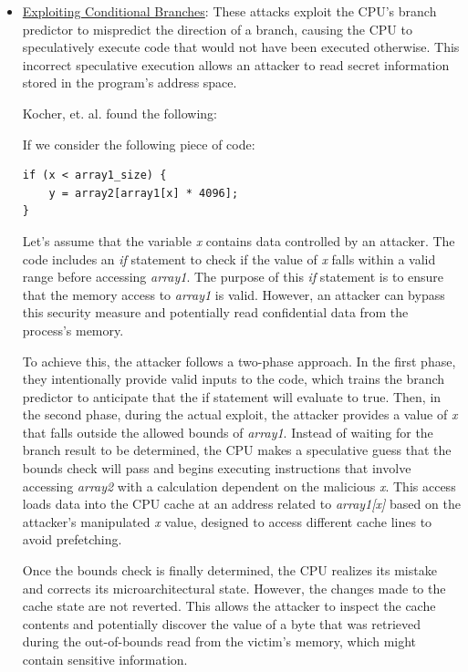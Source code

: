 \documentclass[twocolumn,showpacs,%
  nofootinbib,aps,superscriptaddress,%
  eqsecnum,prd,notitlepage,showkeys,10pt]{revtex4-1}
\begin{document}
\begin{itemize}
\item \underline{Exploiting Conditional Branches}: These attacks exploit the CPU's branch predictor to mispredict the direction of a branch, causing the CPU to speculatively execute code that would not have been executed otherwise. This incorrect speculative execution allows an attacker to read secret information stored in the program’s address space.

Kocher, et. al. found the following:\cite{kocher2020spectre}

If we consider the following piece of code:
\begin{verbatim}
if (x < array1_size) {
    y = array2[array1[x] * 4096];
}
\end{verbatim}

Let's assume that the variable \textit{x} contains data controlled by an attacker. The code includes an \textit{if} statement to check if the value of \textit{x} falls within a valid range before accessing \textit{array1}. The purpose of this \textit{if} statement is to ensure that the memory access to \textit{array1} is valid. However, an attacker can bypass this security measure and potentially read confidential data from the process's memory.

To achieve this, the attacker follows a two-phase approach. In the first phase, they intentionally provide valid inputs to the code, which trains the branch predictor to anticipate that the if statement will evaluate to true. Then, in the second phase, during the actual exploit, the attacker provides a value of \textit{x} that falls outside the allowed bounds of \textit{array1}. Instead of waiting for the branch result to be determined, the CPU makes a speculative guess that the bounds check will pass and begins executing instructions that involve accessing \textit{array2} with a calculation dependent on the malicious \textit{x}. This access loads data into the CPU cache at an address related to \textit{array1[x]} based on the attacker's manipulated \textit{x} value, designed to access different cache lines to avoid prefetching.

Once the bounds check is finally determined, the CPU realizes its mistake and corrects its microarchitectural state. However, the changes made to the cache state are not reverted. This allows the attacker to inspect the cache contents and potentially discover the value of a byte that was retrieved during the out-of-bounds read from the victim's memory, which might contain sensitive information.


\end{itemize}
\end{document}
